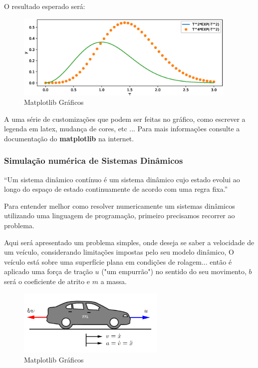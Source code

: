 O resultado esperado será:

\begin{figure}[htb]
    \includegraphics[width=300pt]{chapters/chapter0/figures/python_graph.eps}
    \caption[Desenhando Gráficos Manualmente]{Matplotlib Gráficos}
\end{figure}

A uma série de customizações que podem ser feitas no gráfico, como escrever a legenda em latex, mudança de cores, etc ... Para mais informações consulte a documentação do 
\textbf{matplotlib} na internet.

\subsubsection{Simulação numérica de Sistemas Dinâmicos}

\begin{VF}
    ``Um sistema dinâmico contínuo é um sistema dinâmico cujo estado evolui ao longo do espaço de estado continuamente de acordo com uma regra fixa.''
    
    \end{VF}

    Para entender melhor como resolver numericamente um sistemas dinâmicos utilizando uma linguagem de programação, primeiro precisamos recorrer ao problema.

    Aqui será apresentado um problema simples, onde deseja se saber a velocidade de um veículo, considerando limitações impostas pelo seu modelo dinâmico, O veículo está sobre uma superfície plana em condições de rolagem... então é aplicado uma força de tração $u$ ("um empurrão") no sentido do seu movimento, $b$ será o coeficiente de atrito e $m$ a massa.

\begin{figure}[htb]
    \includegraphics[width=200pt]{chapters/chapter0/figures/cruise_control_schematic.png}
    \caption[Desenhando Gráficos Manualmente]{Matplotlib Gráficos}
\end{figure}

